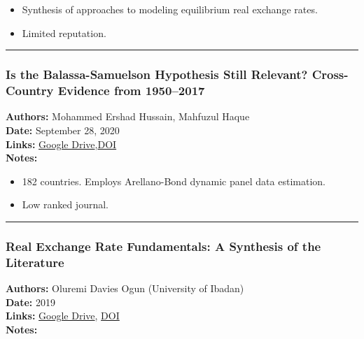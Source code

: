 \documentclass[
  11pt,
]{article}
\providecommand{\tightlist}{%
  \setlength{\itemsep}{0pt}\setlength{\parskip}{0pt}}
\begin{document}
\begin{itemize}
\tightlist
\item
  Synthesis of approaches to modeling equilibrium real exchange rates.
\item
  Limited reputation.
\end{itemize}

\begin{center}\rule{0.5\linewidth}{0.5pt}\end{center}

\subsubsection{Is the Balassa-Samuelson Hypothesis Still Relevant?
Cross-Country Evidence from
1950--2017}\label{is-the-balassa-samuelson-hypothesis-still-relevant-cross-country-evidence-from-19502017-1}

\textbf{Authors:} Mohammed Ershad Hussain, Mahfuzul Haque\\
\textbf{Date:} September 28, 2020\\
\textbf{Links:}
\href{https://drive.google.com/file/d/1UOk4LsRAddTO--0tr4ulynOaXQht7Agv/view?usp=sharing}{Google
Drive},\href{https://doi.org/10.1453/jepe.v7i3.2096}{DOI}\\
\textbf{Notes:}

\begin{itemize}
\tightlist
\item
  182 countries. Employs Arellano-Bond dynamic panel data estimation.
\item
  Low ranked journal.
\end{itemize}

\begin{center}\rule{0.5\linewidth}{0.5pt}\end{center}

\subsubsection{Real Exchange Rate Fundamentals: A Synthesis of the
Literature}\label{real-exchange-rate-fundamentals-a-synthesis-of-the-literature-1}

\textbf{Authors:} Oluremi Davies Ogun (University of Ibadan)\\
\textbf{Date:} 2019\\
\textbf{Links:}
\href{https://drive.google.com/file/d/1SIhMMtsybhiY3eJg-oGcCAvoqJPDKXtQ/view?usp=sharing}{Google
Drive}, \href{https://doi.org/10.6000/1929-7092.2019.08.36}{DOI}\\
\textbf{Notes:}
\end{document}
